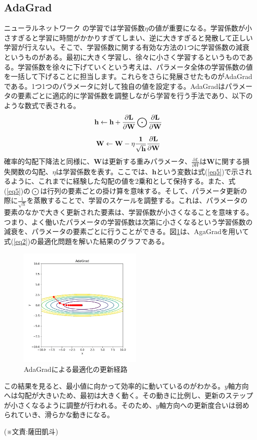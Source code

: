 \subsection{AdaGrad}
{ニューラルネットワーク の学習では学習係数$\displaystyle {\eta}$の値が重要になる。学習係数が小さすぎると学習に時間がかかりすぎてしまい、逆に大きすぎると発散して正しい学習が行えない。そこで、学習係数に関する有効な方法の1つに学習係数の減衰というものがある。最初に大きく学習し、徐々に小さく学習するというものである。学習係数を徐々に下げていくという考えは、パラメータ全体の学習係数の値を一括して下げることに担当します。これらをさらに発展させたものがAdaGradである。1つ1つのパラメータに対して独自の値を設定する。AdaGradはパラメータの要素ごとに適応的に学習係数を調整しながら学習を行う手法であり、以下のような数式で表される。
\begin{equation} 
\label{eq5}
\bf h \leftarrow  h + \frac{\partial L}{\partial W} \bigodot \frac{\partial L}{\partial W}
\end{equation}

\begin{equation}
\label{eq6}
\bf W \leftarrow W - \eta \frac{1}{\sqrt h}  \frac{\partial L}{\partial W}
\end{equation}確率的勾配下降法と同様に、{\bf W}は更新する重みパラメータ、$\displaystyle \frac{\partial L}{\partial W}$は{\bf W}に関する損失関数の勾配、$\displaystyle {\eta}$は学習係数を表す。ここでは、{\bf h}という変数は式(\ref{eq5})で示されるように、これまでに経験した勾配の値を2乗和として保持する。また、式(\ref{eq5})の$\displaystyle {\bigodot}$は行列の要素ごとの掛け算を意味する。そして、パラメータ更新の際に$\displaystyle \frac{1}{\sqrt h}$を蒸散することで、学習のスケールを調整する。これは、パラメータの要素のなかで大きく更新された要素は、学習係数が小さくなることを意味する。つまり、よく働いたパラメータの学習係数は次第に小さくなるという学習係数の減衰を、パラメータの要素ごとに行うことができる。図\ref{gr4}は、AgaGradを用いて式(\ref{eq2})の最適化問題を解いた結果のグラフである。
\begin{figure}[H]
\centering
\includegraphics[width=6cm]{./figure/AdaGrad.png}
\caption{AdaGradによる最適化の更新経路 \label{gr4}}
\end{figure}
この結果を見ると、最小値に向かって効率的に動いているのがわかる。$\displaystyle y$軸方向へは勾配が大きいため、最初は大きく動く。その動きに比例し、更新のステップが小さくなるように調整が行われる。そのため、$\displaystyle y$軸方向への更新度合いは弱められていき、滑らかな動きになる。
\begin{flushright}
  (※文責:薩田凱斗)
\end{flushright}
}






